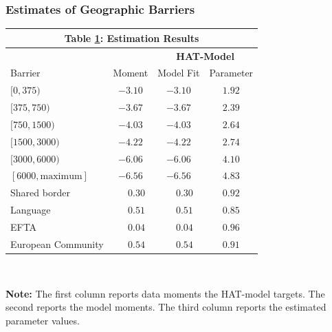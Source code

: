 \documentclass[9pt,pdftex,aspectratio=1610]{beamer}
\theoremstyle{definition}
\begin{document}
\begin{frame}[t]
\frametitle{Estimates of Geographic Barriers}
\begin{table}[t]
\small
\begin{center}
\setlength {\tabcolsep}{5.5mm}
\renewcommand{\arraystretch}{1.10}\label{tb-grav-est}
\begin{tabular}[t]{l c c c}
\multicolumn{4}{c}{{\normalsize\textbf{Table \ref{tb-grav-est}: Estimation Results}} }
\\\hline \hline
& & \multicolumn{2}{c}{\textbf{HAT-Model}}  \\
\cmidrule(lr){3-4}
Barrier& Moment & Model Fit & Parameter \\
\hline $[0,375)$                &$-3.10 $           & $-3.10 $              & $1.92$           \\
$[375,750)$                     &$-3.67 $           & $-3.67 $              & $2.39$           \\
$[750,1500)$                    &$-4.03 $           & $-4.03 $              & $2.64$           \\
$[1500,3000)$                   &$-4.22 $           & $-4.22 $              & $2.74$           \\
$[3000,6000)$                   &$-6.06 $           & $-6.06 $              & $4.10$           \\
$[6000,\mbox{maximum}]$         &$-6.56 $           & $-6.56 $              & $4.83$           \\
Shared border                   &$\phantom{-}0.30$  & $\phantom{-}0.30$     & $0.92$  \\
Language                        &$\phantom{-}0.51$  & $\phantom{-}0.51$     & $0.85$  \\
EFTA                            &$\phantom{-}0.04$  & $\phantom{-}0.04$     & $0.96$  \\
European Community              &$\phantom{-}0.54$  & $\phantom{-}0.54$     & $0.91$  \\
\hline
\end{tabular}
\\[0.5ex]
\parbox{4.2in}{\footnotesize \textbf{Note:} The first column reports data moments the HAT-model targets. The second reports the model moments. The third column reports the estimated parameter values.}
\end{center}
\end{table}
\bigskip
\end{frame}


\setcounter{framenumber}{\value{finalframe}}

\end{document}
